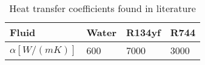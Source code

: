 \begin{table}[h!]
\centering
\caption{Heat transfer coefficients found in literature}\vspace{2mm}
\label{tab:alphas} 
\begin{tabular}{llll}
\toprule
Fluid          & Water & R134yf & R744 \\
\midrule
$\alpha [W/(mK)]$ & 600   & 7000   & 3000\\
\bottomrule
\end{tabular}
\end{table}
